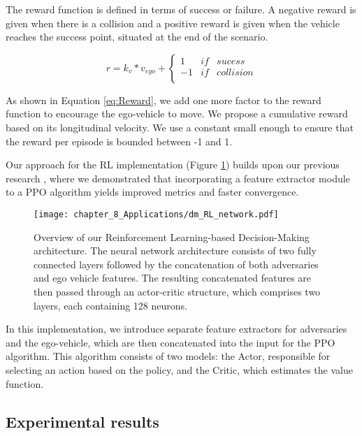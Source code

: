 The reward function is defined in terms of success or failure. A negative reward is given when there is a collision and a positive reward is given when the vehicle reaches the success point, situated at the end of the scenario.

\begin{equation}
	r = k_v * v_{ego} + \left\lbrace\begin{array}{lcc}
		1 & if & sucess \\ 
		-1 & if & collision \\
	\end{array}\right.
	\label{eq:Reward}
\end{equation}

As shown in Equation \ref{eq:Reward}, we add one more factor to the reward function to encourage the ego-vehicle to move. We propose a cumulative reward based on its longitudinal velocity. We use a constant small enough to ensure that the reward per episode is bounded between -1 and 1.

Our approach for the RL implementation (Figure \ref{fig:chapter_8_Applications/dm_RL_network}) builds upon our previous research \cite{Gutierrez2022}, where we demonstrated that incorporating a feature extractor module to a \ac{PPO} algorithm yields improved metrics and faster convergence. 

\begin{figure}[h]
	\centering
	\texttt{[image: chapter\_8\_Applications/dm\_RL\_network.pdf]}
	\captionsetup{justification=justified}
	\caption[Overview of our Reinforcement Learning-based Decision-Making architecture]{Overview of our Reinforcement Learning-based Decision-Making architecture. The neural network architecture consists of two fully connected layers followed by the concatenation of both adversaries and ego vehicle features. The resulting concatenated features are then passed through an actor-critic structure, which comprises two layers, each containing 128 neurons.}	
	\label{fig:chapter_8_Applications/dm_RL_network}
\end{figure}

In this implementation, we introduce separate feature extractors for adversaries and the ego-vehicle, which are then concatenated into the input for the \ac{PPO} algorithm. This algorithm consists of two models: the Actor, responsible for selecting an action based on the policy, and the Critic, which estimates the value function.

\subsection{Experimental results}
\label{subsec:8_decision_making_experimental_results}

